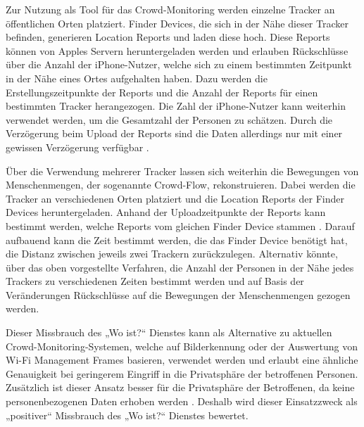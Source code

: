 Zur Nutzung als Tool für das Crowd-Monitoring werden einzelne Tracker an öffentlichen Orten platziert.
Finder Devices, die sich in der Nähe dieser Tracker befinden, generieren Location Reports und laden diese hoch.
Diese Reports können von Apples Servern heruntergeladen werden und erlauben Rückschlüsse über die Anzahl der iPhone-Nutzer, welche sich zu einem bestimmten Zeitpunkt in der Nähe eines Ortes aufgehalten haben.
Dazu werden die Erstellungszeitpunkte der Reports und die Anzahl der Reports für einen bestimmten Tracker herangezogen.
Die Zahl der iPhone-Nutzer kann weiterhin verwendet werden, um die Gesamtzahl der Personen zu schätzen.
Durch die Verzögerung beim Upload der Reports sind die Daten allerdings nur mit einer gewissen Verzögerung verfügbar \cite{Tonetto_FindMy}.

Über die Verwendung mehrerer Tracker lassen sich weiterhin die Bewegungen von Menschenmengen, der sogenannte Crowd-Flow, rekonstruieren.
Dabei werden die Tracker an verschiedenen Orten platziert und die Location Reports der Finder Devices heruntergeladen.
Anhand der Uploadzeitpunkte der Reports kann bestimmt werden, welche Reports vom gleichen Finder Device stammen \cite{Tonetto_FindMy}.
Darauf aufbauend kann die Zeit bestimmt werden, die das Finder Device benötigt hat, die Distanz zwischen jeweils zwei Trackern zurückzulegen.
Alternativ könnte, über das oben vorgestellte Verfahren, die Anzahl der Personen in der Nähe jedes Trackers zu verschiedenen Zeiten bestimmt werden und auf Basis der Veränderungen Rückschlüsse auf die Bewegungen der Menschenmengen gezogen werden.


Dieser Missbrauch des „Wo ist?“ Dienstes kann als Alternative zu aktuellen Crowd-Monitoring-Systemen, welche auf Bilderkennung oder der Auswertung von Wi-Fi Management Frames basieren, verwendet werden und erlaubt eine ähnliche Genauigkeit bei geringerem Eingriff in die Privatsphäre der betroffenen Personen.
Zusätzlich ist dieser Ansatz besser für die Privatsphäre der Betroffenen, da keine personenbezogenen Daten erhoben werden \cite{Tonetto_FindMy}.
Deshalb wird dieser Einsatzzweck als „positiver“ Missbrauch des „Wo ist?“ Dienstes bewertet.


